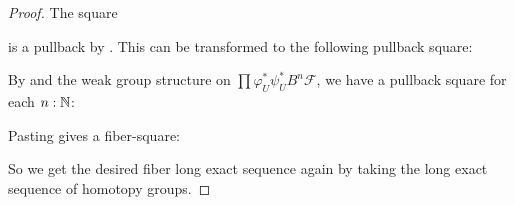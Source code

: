 \begin{proof}
  The square
  \begin{center}
  \end{center}
  is a pullback by \cite[Proposition 2.1.6]{egbert-thesis}.
  This can be transformed to the following pullback square:
  \begin{center}
  \end{center}
  
  By \cite[Lemma 3.3.6]{wellen-thesis} and the weak group structure on $\prod\varphi_U^*\psi_U^* B^n\mathcal F$,
  we have a pullback square for each $n:\mathbb{N}$:
  \begin{center}
  \end{center}
  Pasting gives a fiber-square:
  \begin{center}
  \end{center}
  So we get the desired fiber long exact sequence again by taking the long exact sequence of homotopy groups.
\end{proof}
